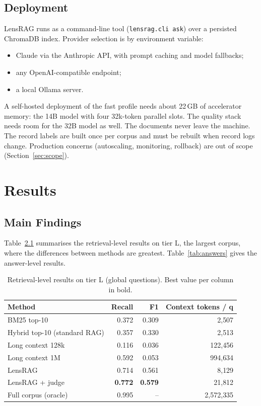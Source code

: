 \documentclass[11pt,letterpaper,oneside]{report}
\begin{document}
\section{Deployment}
\label{sec:deployment}

LensRAG runs as a command-line tool (\texttt{lensrag.cli ask}) over a
persisted ChromaDB index. Provider selection is by environment variable:
\begin{itemize}
  \item Claude via the Anthropic API, with prompt caching and model
  fallbacks;
  \item any OpenAI-compatible endpoint;
  \item a local Ollama server.
\end{itemize}
A self-hosted deployment of the fast profile needs about 22\,GB of
accelerator memory: the 14B model with four 32k-token parallel slots. The
quality stack needs room for the 32B model as well. The documents never
leave the machine. The record labels are built once per corpus and must be
rebuilt when record logs change.
Production concerns (autoscaling, monitoring, rollback) are out of scope
(Section~\ref{sec:scope}).

\chapter{Results}
\label{ch:results}

\section{Main Findings}
\label{sec:findings}

Table~\ref{tab:main} summarises the retrieval-level results on tier L, the
largest corpus, where the differences between methods are greatest.
Table~\ref{tab:answers} gives the answer-level results.

\begin{table}[htbp]
\centering\small
\caption{Retrieval-level results on tier L (global questions). Best value per
column in bold.}
\label{tab:main}
\begin{tabular}{@{}lrrr@{}}
\toprule
Method & Recall & F1 & Context tokens / q \\
\midrule
BM25 top-10 & 0.372 & 0.309 & 2{,}507 \\
Hybrid top-10 (standard RAG) & 0.357 & 0.330 & 2{,}513 \\
Long context 128k & 0.116 & 0.036 & 122{,}456 \\
Long context 1M & 0.592 & 0.053 & 994{,}634 \\
LensRAG & 0.714 & 0.561 & 8{,}129 \\
LensRAG + judge & \textbf{0.772} & \textbf{0.579} & 21{,}812 \\
\midrule
Full corpus (oracle) & 0.995 & -- & 2{,}572{,}335 \\
\bottomrule
\end{tabular}
\end{table}
\end{document}
